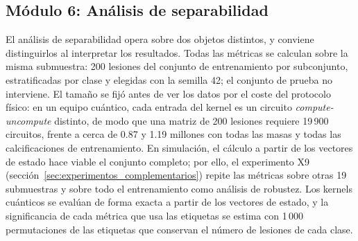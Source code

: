 
\subsection{Módulo 6: Análisis de separabilidad}
\label{sec:modulo6}

El análisis de separabilidad opera sobre dos objetos distintos, y conviene
distinguirlos al interpretar los resultados. Todas las métricas se calculan sobre
la misma submuestra: 200 lesiones del conjunto de entrenamiento por subconjunto,
estratificadas por clase y elegidas con la semilla 42; el conjunto de prueba no interviene.
El tamaño se fijó antes de ver los datos por el coste del protocolo físico: en un equipo cuántico,
cada entrada del kernel es un circuito \textit{compute-uncompute} distinto, de modo que una matriz de
200 lesiones requiere 19\,900 circuitos, frente a cerca de 0.87 y 1.19 millones con todas las masas y
todas las calcificaciones de entrenamiento. En simulación, el cálculo a partir de los vectores de estado
hace viable el conjunto completo; por ello, el experimento X9 (sección~\ref{sec:experimentos_complementarios})
repite las métricas sobre otras 19 submuestras y sobre todo el entrenamiento como análisis de robustez.
Los kernels cuánticos se evalúan de forma exacta a partir de los vectores de estado, y la
significancia de cada métrica que usa las etiquetas se estima con 1\,000 permutaciones de las etiquetas que
conservan el número de lesiones de cada clase.

